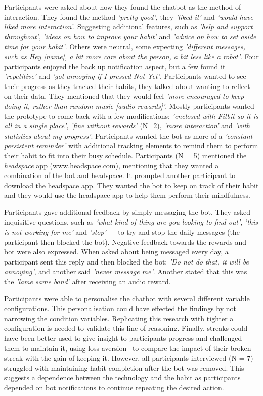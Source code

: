 \documentclass{scaffold/sigchi}
\begin{document}
Participants were asked about how they found the chatbot as the method of interaction. They found the method \textit{'pretty good'}, they \textit{'liked it'} and \textit{'would have liked more interaction'}. Suggesting additional features, such as \textit{'help and support throughout'}, \textit{'ideas on how to improve your habit'} and \textit{'advice on how to set aside time for your habit'}. Others were neutral, some expecting \textit{'different messages, such as Hey [name], a bit more care about the person, a bit less like a robot'}. Four participants enjoyed the back up notification aspect, but a few found it \textit{'repetitive'} and \textit{'got annoying if I pressed Not Yet'}. Participants wanted to see their progress as they tracked their habits, they talked about wanting to reflect on their data. They mentioned that they would feel \textit{'more encouraged to keep doing it, rather than random music [audio rewards]'}. Mostly participants wanted the prototype to come back with a few modifications: \textit{'enclosed with Fitbit so it is all in a single place'}, \textit{'fine without rewards'} (N=2), \textit{'more interaction'} and \textit{'with statistics about my progress'}. Participants wanted the bot as more of a \textit{'constant persistent reminder'} with additional tracking elements to remind them to perform their habit to fit into their busy schedule. Participants (N = 5) mentioned the \textit{headspace} app (\url{www.headspace.com}), mentioning that they wanted a combination of the bot and headspace. It prompted another participant to download the headspace app. They wanted the bot to keep on track of their habit and they would use the headspace app to help them perform their mindfulness.

Participants gave additional feedback by simply messaging the bot. They asked inquisitive questions, such as \textit{'what kind of thing are you looking to find out'}, \textit{'this is not working for me'} and \textit{'stop'} --- to try and stop the daily messages (the participant then blocked the bot). Negative feedback towards the rewards and bot were also expressed. When asked about being messaged every day, a participant sent this reply and then blocked the bot: \textit{'Do not do that, it will be annoying'}, and another said \textit{'never message me'}. Another stated that this was the \textit{'lame same band'} after receiving an audio reward.

Participants were able to personalise the chatbot with several different variable configurations. This personalisation could have effected the findings by not narrowing the condition variables. Replicating this research with tighter a configuration is needed to validate this line of reasoning. Finally, streaks could have been better used to give insight to participants progress and challenged them to maintain it, using loss aversion~\cite{loss_aversion} to compare the impact of their broken streak with the gain of keeping it. However, all participants interviewed (N = 7) struggled with maintaining habit completion after the bot was removed. This suggests a dependence between the technology and the habit as participants depended on bot notifications to continue repeating the desired action.
\end{document}
